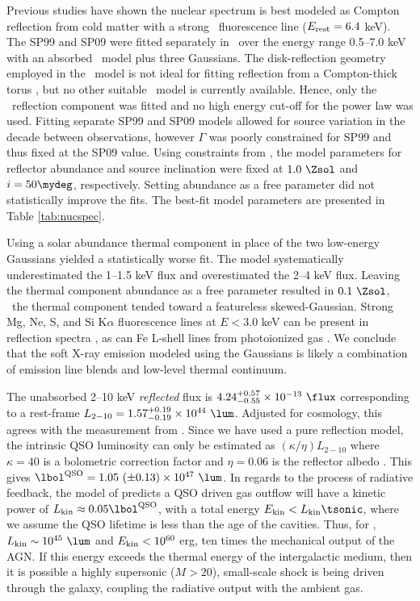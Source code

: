 \documentclass[useAMS,usenatbib]{mn2e}
\begin{document}
Previous studies have shown the nuclear spectrum is best modeled as
Compton reflection from cold matter with a strong \feka\ fluorescence
line ($E_{\rm{rest}} = 6.4$ keV). The SP99 and SP09 were fitted
separately in \xspec\ over the energy range 0.5--7.0 keV with an
absorbed \pexrav\ model \citep{pexrav} plus three Gaussians. The
disk-reflection geometry employed in the \pexrav\ model is not ideal
for fitting reflection from a Compton-thick torus
\citep{2009MNRAS.397.1549M}, but no other suitable \xspec\ model is
currently available. Hence, only the \pexrav\ reflection component was
fitted and no high energy cut-off for the power law was used. Fitting
separate SP99 and SP09 models allowed for source variation in the
decade between observations, however $\Gamma$ was poorly constrained
for SP99 and thus fixed at the SP09 value. Using constraints from
\citet{2000AJ....120..562T}, the model parameters for reflector
abundance and source inclination were fixed at $1.0 ~\Zsol$ and $i =
50\mydeg$, respectively. Setting abundance as a free parameter did not
statistically improve the fits. The best-fit model parameters are
presented in Table \ref{tab:nucspec}.

Using a solar abundance thermal component in place of the two
low-energy Gaussians yielded a statistically worse fit. The model
systematically underestimated the 1--1.5 keV flux and overestimated
the 2--4 keV flux. Leaving the thermal component abundance as a free
parameter resulted in $0.1 ~\Zsol$, \ie\ the thermal component tended
toward a featureless skewed-Gaussian. Strong Mg, Ne, S, and Si
K$\alpha$ fluorescence lines at $E < 3.0$ keV can be present in
reflection spectra \citep{1991MNRAS.249..352G}, as can Fe L-shell
lines from photoionized gas \citep{1990ApJ...362...90B}. We conclude
that the soft X-ray emission modeled using the Gaussians is likely a
combination of emission line blends and low-level thermal continuum.

The unabsorbed 2--10 keV {\it{reflected}} flux is
$4.24^{+0.57}_{-0.55} \times 10^{-13} ~\flux$ corresponding to a
rest-frame $L_{2-10} = 1.57^{+0.19}_{-0.19} \times 10^{44}
~\lum$. Adjusted for cosmology, this agrees with the measurement from
\citet{2001MNRAS.321L..15I}. Since we have used a pure reflection
model, the intrinsic QSO luminosity can only be estimated as
$(\kappa/\eta) L_{2-10}$ where $\kappa = 40$ is a bolometric
correction factor \citep{2007MNRAS.381.1235V} and $\eta = 0.06$ is the
reflector albedo \citep{2009MNRAS.397.1549M}. This gives $\lqso = 1.05
~(\pm 0.13) \times 10^{47} ~\lum$. In regards to the process of
radiative feedback, the model of \citet{2005ApJ...619...60L} predicts
a QSO driven gas outflow will have a kinetic power of $L_{\rm{kin}}
\approx 0.05 \lqso$, with a total energy $E_{\rm{kin}} < L_{\rm{kin}}
\tsonic$, where we assume the QSO lifetime is less than the age of the
cavities. Thus, for \irs, $L_{\rm{kin}} \sim 10^{45} ~\lum$ and
$E_{\rm{kin}} < 10^{60}$ erg, ten times the mechanical output of the
AGN. If this energy exceeds the thermal energy of the intergalactic
medium, then it is possible a highly supersonic ($M > 20$),
small-scale shock is being driven through the galaxy, coupling the
radiative output with the ambient gas.
\end{document}
